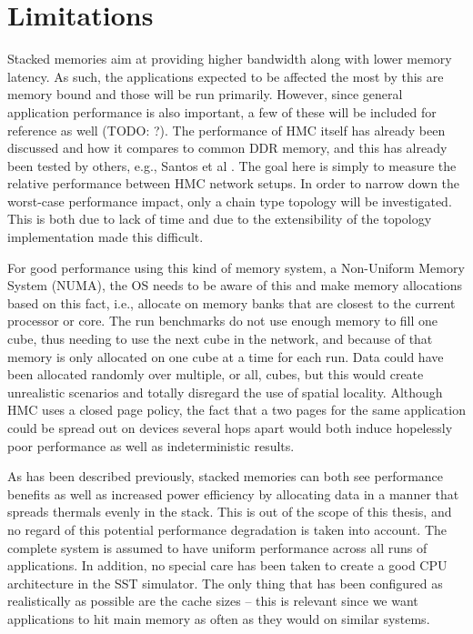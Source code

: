 \section{Limitations}
Stacked memories aim at providing higher bandwidth along with lower memory latency. As such, the applications expected to be affected the most by this are memory bound and those will be run primarily. However, since general application performance is also important, a few of these will be included for reference as well (TODO: ?). The performance of HMC itself has already been discussed and how it compares to common DDR memory, and this has already been tested by others, e.g., Santos et al \cite{santosHMCvsDRAM2017}. The goal here is simply to measure the relative performance between HMC network setups. In order to narrow down the worst-case performance impact, only a chain type topology will be investigated. This is both due to lack of time and due to the extensibility of the topology implementation made this difficult.
\bigskip

For good performance using this kind of memory system, a Non-Uniform Memory System (NUMA), the OS needs to be aware of this and make memory allocations based on this fact, i.e., allocate on memory banks that are closest to the current processor or core. The run benchmarks do not use enough memory to fill one cube, thus needing to use the next cube in the network, and because of that memory is only allocated on one cube at a time for each run. Data could have been allocated randomly over multiple, or all, cubes, but this would create unrealistic scenarios and totally disregard the use of spatial locality. Although HMC uses a closed page policy, the fact that a two pages for the same application could be spread out on devices several hops apart would both induce hopelessly poor performance as well as indeterministic results.
\bigskip

As has been described previously, stacked memories can both see performance benefits as well as increased power efficiency by allocating data in a manner that spreads thermals evenly in the stack. This is out of the scope of this thesis, and no regard of this potential performance degradation is taken into account. The complete system is assumed to have uniform performance across all runs of applications. In addition, no special care has been taken to create a good CPU architecture in the SST simulator. The only thing that has been configured as realistically as possible are the cache sizes -- this is relevant since we want applications to hit main memory as often as they would on similar systems.

